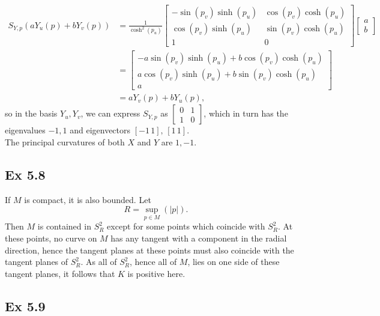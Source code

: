 \documentclass{article}
\theoremstyle{definition}
\begin{document}
\begin{align*}
	S_{Y, p}(a Y_u(p) + b Y_v(p))
	&=
	\frac{1}{\cosh^2(p_u)}
	\begin{bmatrix}
		-\sin(p_v)\sinh(p_u) & \cos(p_v)\cosh(p_u) \\
		\cos(p_v)\sinh(p_u) & \sin(p_v)\cosh(p_u) \\
		1 & 0
	\end{bmatrix}
	\begin{bmatrix}
		a \\
		b
	\end{bmatrix} \\
	&=
	\begin{bmatrix}
		-a\sin(p_v)\sinh(p_u) + b\cos(p_v)\cosh(p_u) \\
		a\cos(p_v)\sinh(p_u)  + b\sin(p_v)\cosh(p_u) \\
		a
	\end{bmatrix} \\
	&=
	aY_v(p) + bY_u(p),
\end{align*}
so in the basis $Y_u, Y_v$, we can express $S_{Y, p}$ as $\begin{bmatrix} 0 & 1
\\ 1 & 0 \end{bmatrix}$, which in turn has the eigenvalues $-1, 1$ and
eigenvectors $[-1\, 1],\, [1\, 1]$. \\

The principal curvatures of both $X$ and $Y$ are $1, -1$.

\subsection*{Ex 5.8}

If $M$ is compact, it is also bounded. Let
\[
	R
	=
	\sup_{p \in M}(|p|).
\]
Then $M$ is contained in $S^2_R$ except for some points which coincide with
$S^2_R$. At these points, no curve on $M$ has any tangent with a component in
the radial direction, hence the tangent planes at these points must also
coincide with the tangent planes of $S^2_R$. As all of $S^2_R$, hence all of
$M$, lies on one side of these tangent planes, it follows that $K$ is positive
here.

\subsection*{Ex 5.9}
\end{document}
